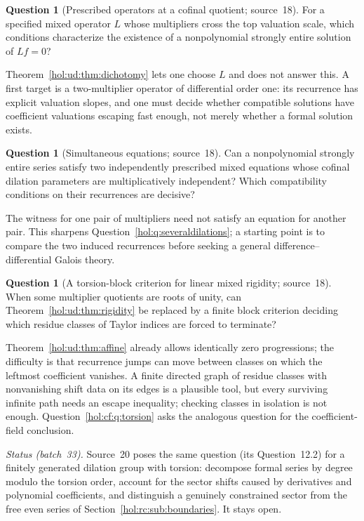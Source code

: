 \documentclass[11pt]{article}
\numberwithin{equation}{section}
\theoremstyle{definition}
\newtheorem{question}[theorem]{Question}
\theoremstyle{remark}
\begin{document}
\begin{question}[Prescribed operators at a cofinal quotient; source~18]
\label{hol:ud:q:prescribed}
For a specified mixed operator $L$ whose multipliers cross the top valuation
scale, which conditions characterize the existence of a nonpolynomial
strongly entire solution of $Lf=0$?
\end{question}

Theorem~\ref{hol:ud:thm:dichotomy} lets one choose $L$ and does not answer
this. A first target is a two-multiplier operator of differential order one:
its recurrence has explicit valuation slopes, and one must decide whether
compatible solutions have coefficient valuations escaping fast enough, not
merely whether a formal solution exists.

\begin{question}[Simultaneous equations; source~18]\label{hol:ud:q:simultaneous}
Can a nonpolynomial strongly entire series satisfy two independently
prescribed mixed equations whose cofinal dilation parameters are
multiplicatively independent? Which compatibility conditions on their
recurrences are decisive?
\end{question}

The witness for one pair of multipliers need not satisfy an equation for
another pair. This sharpens Question~\ref{hol:q:severaldilations}; a starting
point is to compare the two induced recurrences before seeking a general
difference--differential Galois theory.

\begin{question}[A torsion-block criterion for linear mixed rigidity;
source~18]\label{hol:ud:q:torsionblocks}
When some multiplier quotients are roots of unity, can
Theorem~\ref{hol:ud:thm:rigidity} be replaced by a finite block criterion
deciding which residue classes of Taylor indices are forced to terminate?
\end{question}

Theorem~\ref{hol:ud:thm:affine} already allows identically zero progressions;
the difficulty is that recurrence jumps can move between classes on which
the leftmost coefficient vanishes. A finite directed graph of residue classes
with nonvanishing shift data on its edges is a plausible tool, but every
surviving infinite path needs an escape inequality; checking classes in
isolation is not enough. Question~\ref{hol:cf:q:torsion} asks the analogous
question for the coefficient-field conclusion.

\emph{Status (batch~33).} Source~20 poses the same question (its
Question~12.2) for a finitely generated dilation group with torsion: decompose
formal series by degree modulo the torsion order, account for the sector
shifts caused by derivatives and polynomial coefficients, and distinguish a
genuinely constrained sector from the free even series of
Section~\ref{hol:rc:sub:boundaries}. It stays open.
\end{document}
